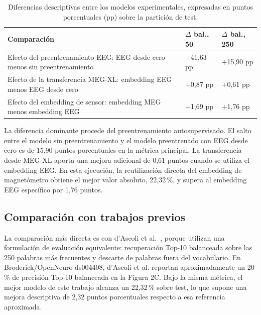\begin{table}[htbp]
\centering
\footnotesize
\setlength{\tabcolsep}{5pt}
\renewcommand{\arraystretch}{1.18}
\begin{tabularx}{\textwidth}{
    >{\raggedright\arraybackslash}X
    >{\centering\arraybackslash}p{2.4cm}
    >{\centering\arraybackslash}p{2.4cm}
}
\toprule
\textbf{Comparación} &
\textbf{\(\Delta\) bal., 50} &
\textbf{\(\Delta\) bal., 250} \\
\midrule
Efecto del preentrenamiento EEG:
EEG desde cero menos sin preentrenamiento &
+41,63 pp &
+15,90 pp \\

Efecto de la transferencia MEG-XL:
embedding EEG menos EEG desde cero &
+0,87 pp &
+0,61 pp \\

Efecto del embedding de sensor:
embedding MEG menos embedding EEG &
+1,69 pp &
+1,76 pp \\
\bottomrule
\end{tabularx}
\caption{Diferencias descriptivas entre los modelos experimentales, expresadas en puntos porcentuales (pp) sobre la partición de test.}
\label{tab:diferencias_condiciones}
\end{table}

La diferencia dominante procede del preentrenamiento autosupervisado. El salto entre el modelo sin preentrenamiento y el modelo preentrenado con EEG desde cero es de 15,90 puntos porcentuales en la métrica principal. La transferencia desde MEG-XL aporta una mejora adicional de 0,61 puntos cuando se utiliza el embedding EEG. En esta ejecución, la reutilización directa del embedding de magnetómetro obtiene el mejor valor absoluto, 22,32\,\%, y supera al embedding EEG específico por 1,76 puntos. 

\subsection{Comparación con trabajos previos}

La comparación más directa es con d'Ascoli et al.~\cite{dascoli2025words}, porque utilizan una formulación de evaluación equivalente: recuperación Top-10 balanceada sobre las 250 palabras más frecuentes y descarte de palabras fuera del vocabulario. En Broderick/OpenNeuro ds004408, d'Ascoli et al. reportan aproximadamente un 20\,\% de precisión Top-10 balanceada en la Figura 2C. Bajo la misma métrica, el mejor modelo de este trabajo alcanza un 22,32\,\% sobre test, lo que supone una mejora descriptiva de 2,32 puntos porcentuales respecto a esa referencia aproximada.

